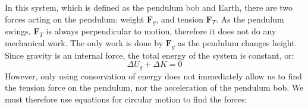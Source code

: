 In this system, which is defined as the pendulum bob and Earth, there are two
forces acting on the pendulum: weight $\bm F_g$, and tension $\bm F_T$. As the
pendulum swings, $\bm F_T$ is always perpendicular to motion, therefore it does
not do any mechanical work. The only work is done by $\bm F_g$ as the pendulum
changes height. Since gravity is an internal force, the total energy of the
system is constant, or:
\begin{equation*}
  \Delta U_g + \Delta K = 0
\end{equation*}
However, only using conservation of energy does not immediately allow us to
find the tension force on the pendulum, nor the acceleration of the pendulum
bob. We must therefore use equations for circular motion to find the forces:


